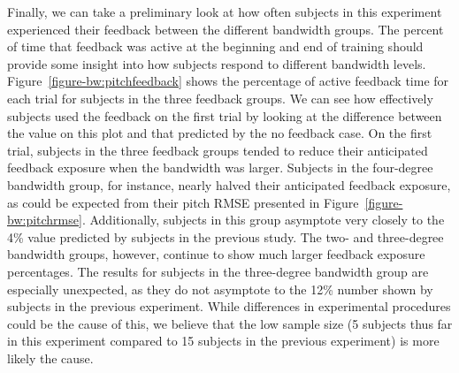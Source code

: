 Finally, we can take a preliminary look at how often subjects in this experiment experienced their feedback between the different bandwidth groups.
The percent of time that feedback was active at the beginning and end of training should provide some insight into how subjects respond to different bandwidth levels.
Figure~\ref{figure-bw:pitchfeedback} shows the percentage of active feedback time for each trial for subjects in the three feedback groups.
We can see how effectively subjects used the feedback on the first trial by looking at the difference between the value on this plot and that predicted by the no feedback case.
On the first trial, subjects in the three feedback groups tended to reduce their anticipated feedback exposure when the bandwidth was larger.
Subjects in the four-degree bandwidth group, for instance, nearly halved their anticipated feedback exposure, as could be expected from their pitch RMSE presented in Figure~\ref{figure-bw:pitchrmse}.
Additionally, subjects in this group asymptote very closely to the 4\% value predicted by subjects in the previous study.
The two- and three-degree bandwidth groups, however, continue to show much larger feedback exposure percentages.
The results for subjects in the three-degree bandwidth group are especially unexpected, as they do not asymptote to the 12\% number shown by subjects in the previous experiment.
While differences in experimental procedures could be the cause of this, we believe that the low sample size (5 subjects thus far in this experiment compared to 15 subjects in the previous experiment) is more likely the cause.

